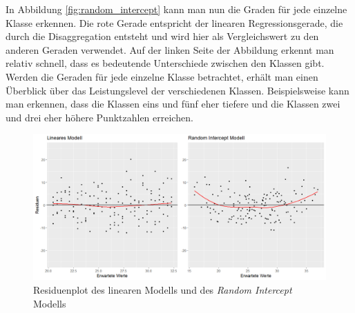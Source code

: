 \documentclass[12pt]{article}\usepackage[]{graphicx}\usepackage[]{color}
\numberwithin{equation}{section}
\begin{document}
In Abbildung \ref{fig:random_intercept} kann man nun die Graden für jede einzelne Klasse erkennen. Die rote Gerade entspricht der linearen Regressionsgerade, die durch die Disaggregation entsteht und wird hier als Vergleichswert zu den anderen Geraden verwendet. Auf der linken Seite der Abbildung erkennt man relativ schnell, dass es bedeutende Unterschiede zwischen den Klassen gibt. Werden die Geraden für jede einzelne Klasse betrachtet, erhält man einen Überblick über das Leistungslevel der verschiedenen Klassen. Beispielsweise kann man erkennen, dass die Klassen eins und fünf eher tiefere und die Klassen zwei und drei eher höhere Punktzahlen erreichen. 
\begin{figure}[b!]
\centering
\includegraphics[width = \textwidth]{residuen_lm_rim}
\caption{Residuenplot des linearen Modells und des \textit{Random Intercept} Modells}
\label{fig:resid_lm_rim}
\end{figure}
\end{document}

